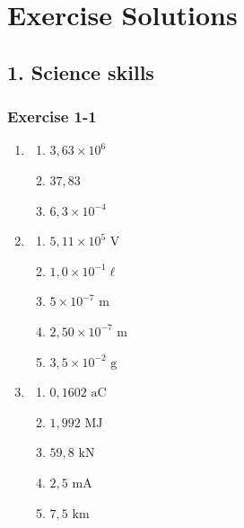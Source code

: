 \chapter{Exercise Solutions}

\section{1. Science skills}

\subsection{Exercise 1-1} 
\begin{multicols}{4}
\begin{enumerate}[noitemsep, label=\textbf{\arabic*}. ] 
\item %
  \begin{enumerate}[itemsep=5pt, label=\textbf{(\alph*)} ] 
    \item $3,63 \times 10^6$
    \item $37,83$
    \item $6,3 \times 10^{−4}$
    \end{enumerate}
\item %
    \begin{enumerate}[itemsep=5pt, label=\textbf{(\alph*)} ] 
    \item $5,11 \times 10^{5} \text{ V}$
    \item $1,0 \times 10^{-1} \ell$
    \item $5 \times 10^{-7} \text{ m}$
    \item $2,50 \times 10^{-7} \text{ m}$
    \item $3,5 \times 10^{-2} \text{ g}$
    \end{enumerate}
 \item %
    \begin{enumerate}[itemsep=5pt, label=\textbf{(\alph*)} ] 
    \item $0,1602 \text{ aC}$
    \item $1,992 \text{ MJ}$
    \item $59,8 \text{ kN}$
    \item $2,5 \text{ mA}$
    \item $7,5 \text{ km}$
    \end{enumerate}
\end{enumerate}
\end{multicols}
